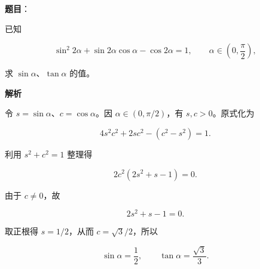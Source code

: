 \begin{answer}

\textbf{题目}：

已知

\nopagebreak[4]
\[
\sin^2 2\alpha+\sin2\alpha\cos\alpha-\cos2\alpha=1,\qquad
\alpha\in\left(0,\frac\pi2\right),
\]

求 $\sin\alpha\text{、}\tan\alpha$ 的值。

\textbf{解析}

令 $s=\sin\alpha$、$c=\cos\alpha$。因 $\alpha\in(0,\pi/2)$，有 $s,c>0$。原式化为

\nopagebreak[4]
\[
4s^2c^2+2sc^2-(c^2-s^2)=1.
\]

利用 $s^2+c^2=1$ 整理得

\nopagebreak[4]
\[
2c^2(2s^2+s-1)=0.
\]

由于 $c\neq0$，故

\nopagebreak[4]
\[
2s^2+s-1=0.
\]

取正根得 $s=1/2$，从而 $c=\sqrt3/2$，所以

\nopagebreak[4]
\[
\sin\alpha=\frac12,\qquad
\tan\alpha=\frac{\sqrt3}{3}.
\]


\end{answer}
